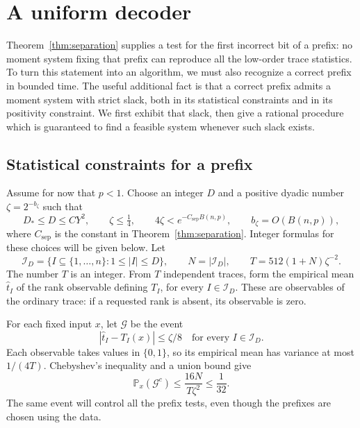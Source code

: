 \section{A uniform decoder}\label{sec:decoding}

Theorem~\ref{thm:separation} supplies a test for the first incorrect bit of
a prefix: no moment system fixing that prefix can reproduce all the
low-order trace statistics.  To turn this statement into an algorithm,
we must also recognize a correct prefix in bounded time.  The useful
additional fact is that a correct prefix admits a moment system with
strict slack, both in its statistical constraints and in its positivity
constraint.  We first exhibit that slack, then give a rational procedure
which is guaranteed to find a feasible system whenever such slack exists.

\subsection{Statistical constraints for a prefix}

Assume for now that \(p<1\).  Choose an integer \(D\) and a positive dyadic
number \(\zeta=2^{-b_\zeta}\) such that
\begin{equation}\label{eq:decoder-parameters}
 D_*\le D\le C Y^2,\qquad
 \zeta\le \tfrac14,\qquad
 4\zeta<e^{-C_{\mathrm{sep}}B(n,p)},\qquad b_\zeta=O(B(n,p)),
\end{equation}
where \(C_{\mathrm{sep}}\) is the constant in
Theorem~\ref{thm:separation}.  Integer formulas for these choices will be
given below.  Let
\[
 \mathcal I_D=\{I\subseteq\{1,\ldots,n\}:1\le |I|\le D\},
 \qquad N=|\mathcal I_D|,
 \qquad T=512(1+N)\zeta^{-2}.
\]
The number \(T\) is an integer.  From \(T\) independent traces, form the
empirical mean \(\widehat t_I\) of the rank observable defining \(T_I\),
for every \(I\in\mathcal I_D\).  These are observables of the ordinary
trace: if a requested rank is absent, its observable is zero.

For each fixed input \(x\), let \(\mathcal G\) be the event
\begin{equation}\label{eq:empirical-good}
 |\widehat t_I-T_I(x)|\le \zeta/8
 \quad\text{for every }I\in\mathcal I_D.
\end{equation}
Each observable takes values in \(\{0,1\}\), so its empirical mean has
variance at most \(1/(4T)\).  Chebyshev's inequality and a union bound give
\begin{equation}\label{eq:good-probability}
 \mathbb P_x(\mathcal G^c)
 \le \frac{16N}{T\zeta^2}\le\frac1{32}.
\end{equation}
The same event will control all the prefix tests, even though the
prefixes are chosen using the data.

